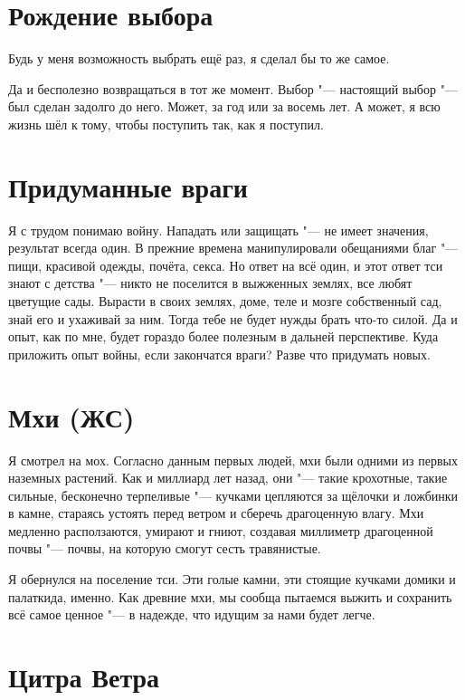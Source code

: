 \section{Рождение выбора}

Будь у меня возможность выбрать ещё раз, я сделал бы то же самое.

Да и бесполезно возвращаться в тот же момент.
Выбор "--- настоящий выбор "--- был сделан задолго до него.
Может, за год или за восемь лет.
А может, я всю жизнь шёл к тому, чтобы поступить так, как я поступил.

\section{Придуманные враги}

Я с трудом понимаю войну.
Нападать или защищать "--- не имеет значения, результат всегда один.
В прежние времена манипулировали обещаниями благ "--- пищи, красивой одежды, почёта, секса.
Но ответ на всё один, и этот ответ тси знают с детства "--- никто не поселится в выжженных землях, все любят цветущие сады.
Вырасти в своих землях, доме, теле и мозге собственный сад, знай его и ухаживай за ним.
Тогда тебе не будет нужды брать что-то силой.
Да и опыт, как по мне, будет гораздо более полезным в дальней перспективе.
Куда приложить опыт войны, если закончатся враги?
Разве что придумать новых.

\section{Мхи (ЖС)}

Я смотрел на мох.
Согласно данным первых людей, мхи были одними из первых наземных растений.
Как и миллиард лет назад, они "--- такие крохотные, такие сильные, бесконечно терпеливые "--- кучками цепляются за щёлочки и ложбинки в камне, стараясь устоять перед ветром и сберечь драгоценную влагу.
Мхи медленно расползаются, умирают и гниют, создавая миллиметр драгоценной почвы "--- почвы, на которую смогут сесть травянистые.

Я обернулся на поселение тси.
Эти голые камни, эти стоящие кучками домики и палатки\ldotst да, именно.
Как древние мхи, мы сообща пытаемся выжить и сохранить всё самое ценное "--- в надежде, что идущим за нами будет легче.

\section{Цитра Ветра}

